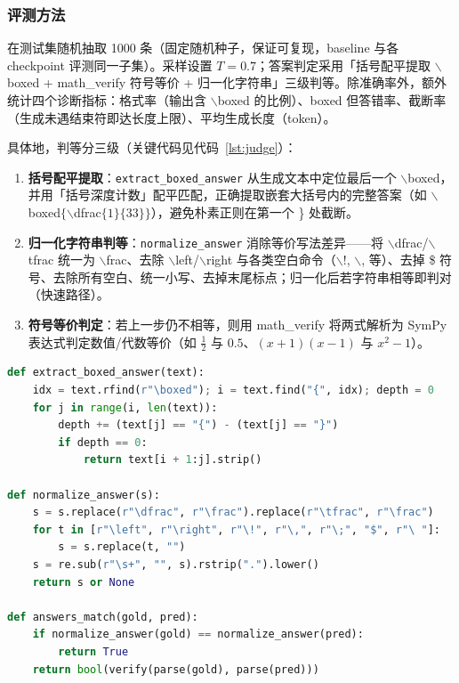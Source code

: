 \subsubsection{评测方法} 在测试集随机抽取 1000 条（固定随机种子，保证可复现，baseline 与各 checkpoint 评测同一子集）。采样设置 $T{=}0.7$；答案判定采用「括号配平提取 $\backslash$boxed + math\_verify 符号等价 + 归一化字符串」三级判等。除准确率外，额外统计四个诊断指标：格式率（输出含 $\backslash$boxed 的比例）、boxed 但答错率、截断率（生成未遇结束符即达长度上限）、平均生成长度（token）。

具体地，判等分三级（关键代码见代码~\ref{lst:judge}）：
\begin{enumerate}
  \item \textbf{括号配平提取}：\texttt{extract\_boxed\_answer} 从生成文本中定位最后一个 $\backslash$boxed，并用「括号深度计数」配平匹配，正确提取嵌套大括号内的完整答案（如 $\backslash$boxed$\{\backslash$dfrac$\{1\}\{33\}\}$），避免朴素正则在第一个 \} 处截断。
  \item \textbf{归一化字符串判等}：\texttt{normalize\_answer} 消除等价写法差异——将 $\backslash$dfrac/$\backslash$tfrac 统一为 $\backslash$frac、去除 $\backslash$left/$\backslash$right 与各类空白命令（$\backslash$!, $\backslash$, 等）、去掉 \$ 符号、去除所有空白、统一小写、去掉末尾标点；归一化后若字符串相等即判对（快速路径）。
  \item \textbf{符号等价判定}：若上一步仍不相等，则用 math\_verify 将两式解析为 SymPy 表达式判定数值/代数等价（如 $\frac{1}{2}$ 与 $0.5$、$(x{+}1)(x{-}1)$ 与 $x^2{-}1$）。
\end{enumerate}

\begin{lstlisting}[language=Python, caption={答案提取与三级判等核心逻辑伪代码}, label={lst:judge}]
def extract_boxed_answer(text):
    idx = text.rfind(r"\boxed"); i = text.find("{", idx); depth = 0
    for j in range(i, len(text)):
        depth += (text[j] == "{") - (text[j] == "}")
        if depth == 0:
            return text[i + 1:j].strip()

def normalize_answer(s):
    s = s.replace(r"\dfrac", r"\frac").replace(r"\tfrac", r"\frac")
    for t in [r"\left", r"\right", r"\!", r"\,", r"\;", "$", r"\ "]:
        s = s.replace(t, "")
    s = re.sub(r"\s+", "", s).rstrip(".").lower()
    return s or None

def answers_match(gold, pred):
    if normalize_answer(gold) == normalize_answer(pred):
        return True
    return bool(verify(parse(gold), parse(pred)))
\end{lstlisting}

